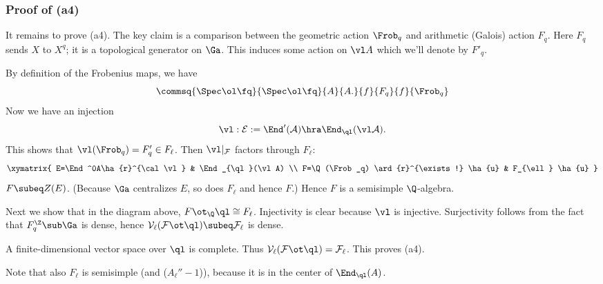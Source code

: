 \subsubsection{Proof of (a4)}

It remains to prove (a4). The key claim is a comparison between the geometric action $\Frob_q$ and arithmetic (Galois) action $F_q$. Here $F_q$ sends $X$ to $X^q$; it is a topological generator on $\Ga$. This induces some action on $\vl A$ which we'll denote by $F'_q$.

By definition of the Frobenius maps, we have
\[
\commsq{\Spec \ol \fq}{\Spec \ol \fq}{A}{A.}{f}{F_q}{f}{\Frob_q}
\]
Now we have an injection 
\[
\cal \vl:
E:=\End^0(A)\hra \End_{\ql}(\vl A).
\]
This shows that $\vl (\Frob_q)=F_q'\in F_{\ell}$. Then $\cal \vl|_F$ factors through $F_{\ell}$:
\[
\xymatrix{
E=\End^0A\ha{r}^{\cal \vl } & \End_{\ql}(\vl A) \\
F=\Q(\Frob_q) \ard{r}^{\exists !} \ha{u} & F_{\ell} \ha{u}
}
\]
$F\subeq Z(E)$. (Because $\Ga$ centralizes $E$, so does $F_{\ell}$ and hence $F$.) Hence $F$ is a semisimple $\Q$-algebra. 

Next we show that in the diagram above, $F\ot_{\Q}\ql\cong F_{\ell}$. Injectivity is clear because $\cal \vl$ is injective. Surjectivity follows from the fact that $F_q^{\Z}\sub \Ga$ is dense, hence $\cal V_{\ell}(F\ot \ql)\subeq F_{\ell}$ is dense. %

A finite-dimensional vector space over $\ql$ is complete. Thus $\cal V_{\ell}(F\ot \ql)=F_{\ell}$. This proves (a4).

Note that also $F_{\ell}$ is semisimple (and ($A_{\ell}''-1$)), because it is in the center of $\End_{\ql}(A)$.

